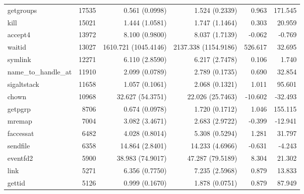 \begin{longtable}{>{\ttfamily}lrrrrr}
                      getgroups &      17535 &              0.561 (0.0998) &            1.524 (0.2339) &           0.963 &      171.545 \\
                           kill &      15021 &              1.444 (1.0581) &            1.747 (1.1464) &           0.303 &       20.959 \\
                        accept4 &      13972 &              8.100 (0.9800) &            8.037 (1.7139) &          -0.062 &       -0.769 \\
                         waitid &      13027 &        1610.721 (1045.4146) &      2137.338 (1154.9186) &         526.617 &       32.695 \\
                        symlink &      12271 &              6.110 (2.8590) &            6.217 (2.7478) &           0.106 &        1.740 \\
           name\_to\_handle\_at &      11910 &              2.099 (0.0789) &            2.789 (0.1735) &           0.690 &       32.854 \\
                    sigaltstack &      11658 &              1.057 (0.1061) &            2.068 (0.1321) &           1.011 &       95.601 \\
                          chown &      10968 &            32.627 (54.3751) &          22.026 (25.7463) &         -10.602 &      -32.493 \\
                        getpgrp &       8706 &              0.674 (0.0978) &            1.720 (0.1712) &           1.046 &      155.115 \\
                         mremap &       7004 &              3.082 (3.4671) &            2.683 (2.9722) &          -0.399 &      -12.941 \\
                      faccessat &       6482 &              4.028 (0.8014) &            5.308 (0.5294) &           1.281 &       31.797 \\
                       sendfile &       6358 &             14.864 (2.8401) &           14.233 (4.6966) &          -0.631 &       -4.243 \\
                       eventfd2 &       5900 &            38.983 (74.9017) &          47.287 (79.5189) &           8.304 &       21.302 \\
                           link &       5271 &              6.356 (0.7750) &            7.235 (2.5968) &           0.879 &       13.833 \\
                         gettid &       5126 &              0.999 (0.1670) &            1.878 (0.0751) &           0.879 &       87.949 \\

\end{longtable}
